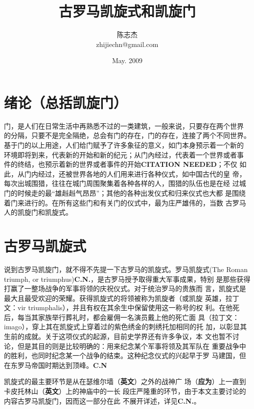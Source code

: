 \documentclass[a4paper,dvipdfm]{article}
\begin{document}


\title{古罗马凯旋式和凯旋门}
\author{陈志杰 \\ zhijiechn@gmail.com}
\date{May. 2009}

\maketitle

\tableofcontents

\section{绪论（总括凯旋门）}

门，是人们在日常生活中再熟悉不过的一类建筑，一般来说，只要存在两个世界
的分隔，只要不是完全隔绝，总会有门的存在，门的存在，连接了两个不同世界。
基于门的以上用途，人们给门赋予了许多象征的意义，如门本身预示着一个新的
环境即将到来，代表新的开始和新的纪元；从门內经过，代表着一个世界或者事
件的终结，也预示着新的世界或者事件的开始\textbf{CITATION NEEDED}；不仅
如此，从门内经过，还被世界各地的人们用来进行各种仪式，如中国古代的皇
帝，每次出城围猎，往往在城门周围聚集着各种各样的人，围猎的队伍也是在经
过城门的时候走的最``雄赳赳气昂昂''；其他的各种出发仪式和归来仪式也大都
是围绕着门来进行的。在所有这些门和有关门的仪式中，最为庄严雄伟的，当数
古罗马人的凯旋门和凯旋式。

\section{古罗马凯旋式}

说到古罗马凯旋门，就不得不先提一下古罗马的凯旋式。罗马凯旋式(The Roman
triumph, or triumphus)\textbf{C.N.}，是古罗马授予取得重大军事成果，特别
是那些获得打赢了一整场战争的军事将领的庆祝仪式。对于统治罗马的贵族而
言，凯旋式是最大且最受欢迎的荣耀。获得凯旋式的将领被称为凯旋者（或凯旋
英雄，拉丁文：vir triumphalis），并且有权在其余生中保留使用这一称号的权
利。在他死后，每当其家族举行葬礼时，都会雇佣一名演员戴上他的死亡面
具（拉丁文：imago），穿上其在凯旋式上穿着过的紫色绣金的刺绣托加相同的托
加，以彰显其生前的成就。关于这项仪式的起源，目前史学界还有许多争议，本
文也暂不讨论，但是其目的则是比较明确的：用来纪念某个军事将领及其军队在
重要战争中的胜利，也同时纪念某一个战争的结束。这种纪念仪式的兴起早于罗
马建国，但在东罗马帝国时期达到顶峰。\textbf{C.N}

凯旋式的最主要环节是从在瑟维尔墙（\textbf{英文}）之外的战神广
场（\textbf{应为}）上一直到卡皮托林山（\textbf{英文}）上的神庙中的一长
段庄严隆重的环节，由于本文主要讨论的内容古罗马凯旋门，因而这一部分在此
不展开详述，详见\textbf{C.N.}。
\end{document}
